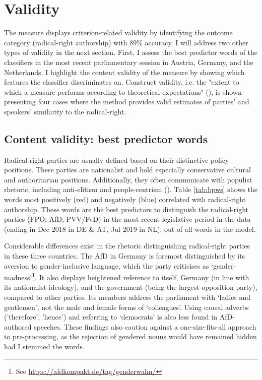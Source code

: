 \documentclass{article}
\begin{document}
\section{Validity}
The measure displays criterion-related validity by identifying the outcome category (radical-right authorship) with 89\% accuracy. I will address two other types of validity in the next section. First, I assess the best predictor words of the classifiers in the most recent parliamentary session in Austria, Germany, and the Netherlands. I highlight the content validity of the measure by showing which features the classifier discriminates on. Construct validity, i.e. the "extent to which a measure performs according to theoretical expectations" (\cite{Carmines2004Validity}), is shown presenting four cases where the method provides valid estimates of parties' and speakers' similarity to the radical-right. \par



\subsection{Content validity: best predictor words}

Radical-right parties are usually defined based on their distinctive policy positions. These parties are nationalist and hold especially conservative cultural and authoritarian positions. Additionally, they often communicate with populist rhetoric, including anti-elitism and people-centrism (\cite{Mudde2007}). Table \ref{tab:bpws} shows the words most positively (red) and negatively (blue) correlated with radical-right authorship. These words are the best predictors to distinguish the radical-right parties (FPÖ; AfD; PVV/FvD) in the most recent legislative period in the data (ending in Dec 2018 in DE \& AT, Jul 2019 in NL), out of all words in the model. \par

Considerable differences exist in the rhetoric distinguishing radical-right parties in these three countries. The AfD in Germany is foremost distinguished by its aversion to gender-inclusive language, which the party criticises as ‘gender-madness’\footnote{See \url{https://afdkompakt.de/tag/genderwahn/}}. It also displays heightened reference to itself, Germany (in line with its nationalist ideology), and the government (being the largest opposition party), compared to other parties. Its members address the parliament with ‘ladies and gentlemen’, not the male and female forms of ‘colleagues’. Using causal adverbs ('therefore', 'hence') and referring to ‘democrats’ is also less found in AfD-authored speeches. These findings also caution against a one-size-fits-all approach to pre-processing, as the rejection of gendered nouns would have remained hidden had I stemmed the words. \par
\end{document}
